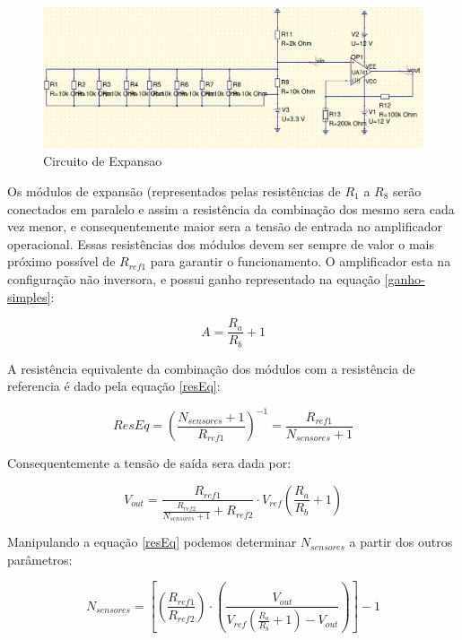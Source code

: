 \begin{figure}[htbp]
    \centering
        \includegraphics[scale=0.1]{figuras/exp-board-detection.png}
    \caption{Circuito de Expansao}
    \label{circ-exp}
\end{figure}

Os módulos de expansão (representados pelas resistências de $R_{1}$ a $R_{8}$ serão conectados em paralelo e assim a resistência da combinação dos mesmo sera cada vez menor, e consequentemente maior sera a tensão de entrada no amplificador operacional. Essas resistências dos módulos devem ser sempre de valor o mais próximo possível de $R_{ref1}$ para garantir o funcionamento. O amplificador esta na configuração não inversora, e possui ganho representado na equação \ref{ganho-simples}:

\begin{equation}\label{ganho-simples}
A=\frac{ R_{a} }{ R_{b} } + 1
\end{equation}

A resistência equivalente da combinação dos módulos com a resistência de referencia é dado pela equação \ref{resEq}:

\begin{equation}\label{resEq}
ResEq = \left( \frac{ N_{sensores} + 1 }{ R_{ref1} } \right)^{-1}  = \frac{ R_{ref1} }{ N_{sensores} + 1 }
\end{equation}

Consequentemente a tensão de saída sera dada por:

\begin{equation}\label{resEq}
V_{out} = \frac{R_{ref1}}{\frac{ R_{ref2} }{ N_{sensores} + 1 } + R_{ref2}} \cdot V_{ref} \left( \frac{ R_{a} }{ R_{b} } + 1\right)
\end{equation}

Manipulando a equação \ref{resEq} podemos determinar $N_{sensores}$ a partir dos outros parâmetros:

\begin{equation}\label{Nsen1}
N_{sensores} = \left[ \left( \frac{R_{ref1}}{R_{ref2}} \right) \cdot \left( \frac{V_{out}}{V_{ref} \left( \frac{ R_{a} }{ R_{b} } + 1\right) - V_{out}} \right) \right] - 1
\end{equation}

